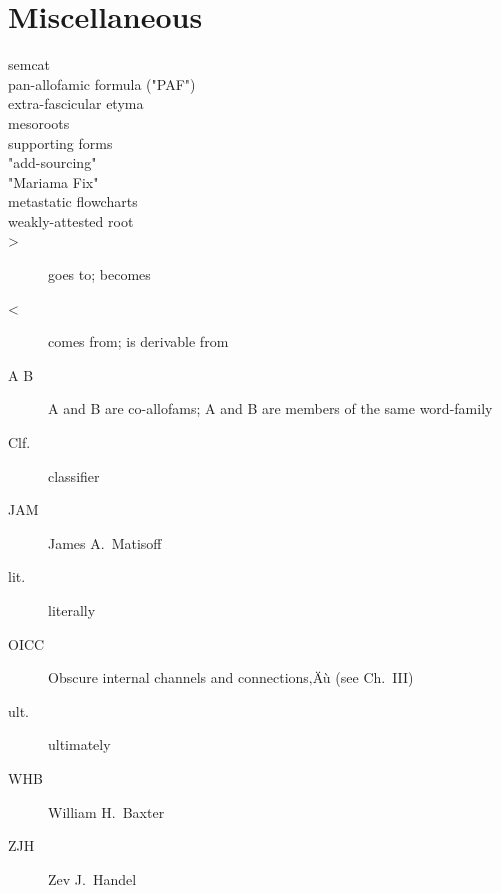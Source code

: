 \section*{Miscellaneous}
\begin{multicols}{2}
\begin{description}
\item[semcat]
\item[pan-allofamic formula ("PAF")]
\item[extra-fascicular etyma]
\item[mesoroots]
\item[supporting forms]
\item["add-sourcing"]
\item["Mariama Fix"]
\item[metastatic flowcharts]
\item[weakly-attested root]
\item[>]	goes to; becomes
\item[<]	comes from; is derivable from
\item[A  B]		A and B are co-allofams; A and B are members of the same word-family
\item[Clf.]	classifier
\item[JAM]	James A.\ Matisoff
\item[lit.]	literally
\item[OICC]	Obscure internal channels and connections‚Äù (see Ch.~III)
\item[ult.]	ultimately
\item[WHB]	William H.\ Baxter
\item[ZJH]	Zev J.\ Handel
\end{description}
\end{multicols}
